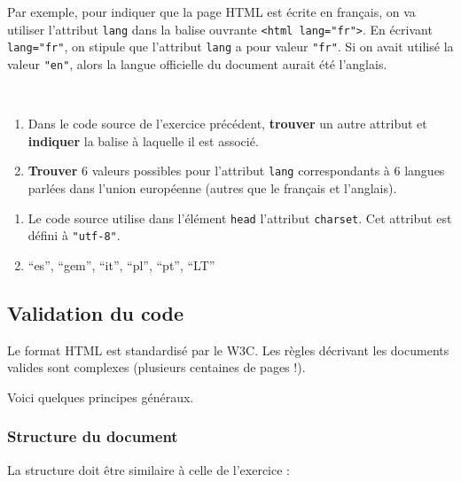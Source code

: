 \documentclass[a4paper,17pt]{extarticle}
\newenvironment{eleve}%
{\begin{activite}\color{noiramu}\\}
{\end{activite}}
\providecommand{\tightlist}{%
      \setlength{\itemsep}{0pt}\setlength{\parskip}{0pt}}
\begin{document}
Par exemple, pour indiquer que la page HTML est écrite en français, on
va utiliser l'attribut \texttt{lang} dans la balise ouvrante
\texttt{\textless{}html\ lang="fr"\textgreater{}}. En écrivant
\texttt{lang="fr"}, on stipule que l'attribut \texttt{lang} a pour
valeur \texttt{"fr"}. Si on avait utilisé la valeur \texttt{"en"}, alors
la langue officielle du document aurait été l'anglais.
\begin{eleve}
    \begin{enumerate}
\def\labelenumi{\arabic{enumi}.}
\tightlist
\item
  Dans le code source de l'exercice précédent, \textbf{trouver} un autre
  attribut et \textbf{indiquer} la balise à laquelle il est associé.
\item
  \textbf{Trouver} 6 valeurs possibles pour l'attribut \texttt{lang}
  correspondants à 6 langues parlées dans l'union européenne (autres que
  le français et l'anglais).
\end{enumerate}
        
        \end{eleve}\begin{reponse}
    \begin{enumerate}
\def\labelenumi{\arabic{enumi}.}
\tightlist
\item
  Le code source utilise dans l'élément \texttt{head} l'attribut
  \texttt{charset}. Cet attribut est défini à \texttt{"utf-8"}.
\item
  ``es'', ``gem'', ``it'', ``pl'', ``pt'', ``LT''
\end{enumerate}

            \end{reponse}
    \hypertarget{validation-du-code}{%
\subsection{Validation du code}\label{validation-du-code}}

    Le format HTML est standardisé par le W3C. Les règles décrivant les
documents valides sont complexes (plusieurs centaines de pages !).

Voici quelques principes généraux.

\hypertarget{structure-du-document}{%
\subsubsection{Structure du document}\label{structure-du-document}}

La structure doit être similaire à celle de l'exercice :
\end{document}
